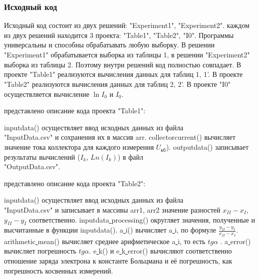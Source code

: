 \subsubsection{Исходный код}
Исходный код состоит из двух решений: "Experiment1", "Experiment2".  каждом из двух решений находится 3 проекта: "Table1"\verb||, "Table2"\verb||, "I0". Программы универсальны и способны обрабатывать любую выборку. В решении "Experiment1"\verb|| обрабатывается выборка из таблицы 1, в решении "Experiment2" \\выборка из таблицы 2. Поэтому внутри решений код полностью совпадает. В проекте "Table1"\verb|| реализуются вычисления данных для таблиц 1, 1'. В проекте  "Table2"\verb|| реализуются вычисления данных для таблиц 2, 2'. В проекте "I0"\verb|| осуществляется вычисление $\ln I_0$ и $I_0$.
\vspace{3mm}
\begin{center} представлено описание кода проекта "Table1":\end{center}
 inputdata() осуществляет ввод исходных данных из файла \\"InputData.csv"\verb||
и сохранения их в массив arr.
 collector\underline{}current() вычисляет значение тока коллектора для каждого измерения $U_{кб}$).
 outputdata() записывает результаты вычислений ($I_k$, $Ln(I_k)$) в файл \\"OutputData.csv".
\vspace{3mm}
\begin{center} представлено описание кода проекта "Table2":\end{center}
 inputdata() осуществляет ввод исходных данных из файла \\"InputData.csv"\verb||
и записывает в массивы arr1, arr2 значение разностей $x_{II}-x_I$, $y_{II}-y_I$ соответственно.
 inputdata\underline{ }processing() округляет значения, полученные и высчитанные в функции inputdata().
 a\underline{ }i() вычисляет a\underline{ }i, по формуле $\frac{y_{II}-y_I}{x_{II}-x_I}$.
  arithmetic\underline{ }mean() вычисляет среднее арифметическое a\underline{ }i, то есть $tg \alpha$ .
 a\underline{ }error() вычисляет погрешность $tg \alpha$.
 e\underline{ }k() и e\underline{ }k\underline{ }error() вычисляют соответственно отношение заряда электрона к константе Больцмана и её погрешность, как погрешность косвенных измерений.


